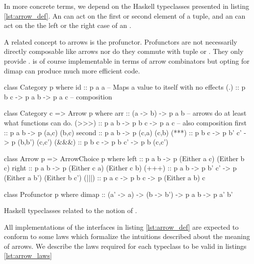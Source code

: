 In more concrete terms, we depend on the Haskell typeclasses presented
in listing \ref{lst:arrow_def}. An  can act on the first
or second element of a tuple, and an  can act on the
the left or the right case of an .

A related concept to arrows is the profunctor. Profunctors are not
necessarily directly composable like arrows nor do they commute with
tuple or . They only provide . 
is of course implementable in terms of arrow combinators but opting
for dimap can produce much more efficient code.


\begin{code}
\begin{haskellcode}
class Category p where
  id :: p a a -- Maps a value to itself with no effects
  (.) :: p b c -> p a b -> p a c -- composition

class Category c => Arrow p where
  arr :: (a -> b) -> p a b -- arrows do at least what functions can do.
  (>>>) :: p a b -> p b c -> p a c -- also composition
  first :: p a b -> p (a,c) (b,c)
  second :: p a b -> p (c,a) (c,b)
  (***) :: p b c -> p b' c' -> p (b,b') (c,c')
  (&&&) :: p b c -> p b c' -> p b (c,c')

class Arrow p => ArrowChoice p where
  left :: p a b -> p (Either a c) (Either b c)
  right :: p a b -> p (Either c a) (Either c b)
  (+++) :: p a b -> p b' c' -> p (Either a b') (Either b c')
  (|||) :: p a c -> p b c -> p (Either a b) c

class Profunctor p where
  dimap :: (a' -> a) -> (b -> b') -> p a b -> p a' b'
\end{haskellcode}
  \caption{\label{lst:arrow_def}Haskell typeclasses related to the
    notion of .}
\end{code}


All implementations of the interfaces in listing \ref{lst:arrow_def}
are expected to conform to some laws which formalize the intuitions
described about the meaning of arrows. We describe the laws required
for each typeclass to be valid in listings \ref{lst:arrow_laws}

